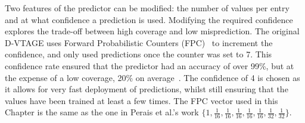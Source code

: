 Two features of the predictor can be modified: the number of values per entry and at what confidence a prediction is used.
Modifying the required confidence explores the trade-off between high coverage and low misprediction.
The original D-VTAGE uses Forward Probabilistic Counters (FPC)~\cite{riley2006fpc} to increment the confidence, and only used predictions once the counter was set to 7.
This confidence rate ensured that the predictor had an accuracy of over 99\%, but at the expense of a low coverage, 20\% on average~\cite{peraisBeBop2015}.
The confidence of 4 is chosen as it allows for very fast deployment of predictions, whilst still ensuring that the values have been trained at least a few times.
The FPC vector used in this Chapter is the same as the one in Perais et al.'s work $\{1,\frac{1}{16},\frac{1}{16},\frac{1}{16},\frac{1}{16},\frac{1}{16},\frac{1}{32},\frac{1}{32}\}$.
 




